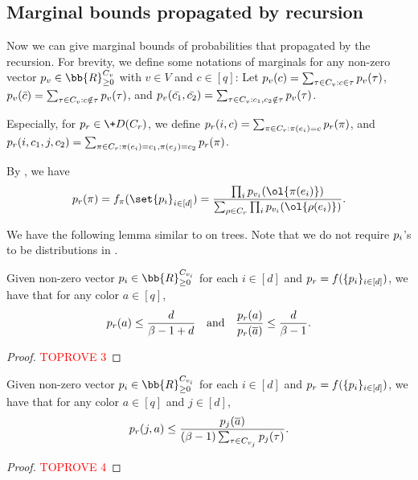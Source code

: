 \documentclass[a4paper,11pt]{article}
\begin{document}
\subsection{Marginal bounds propagated by recursion}\label{sec:marginal_bounds_on_trees}
Now we can give marginal bounds of probabilities that propagated by the recursion. For brevity, we define some notations of marginals for any non-zero vector $\*p_v\in \bb{R}_{\geq 0}^{C_v}$ with $v\in V$ and $c\in [q]$: Let $\*p_v(c)=\sum_{\tau \in C_v:c \in \tau} \*p_v(\tau)$, $\*p_v(\bar{c})=\sum_{\tau \in C_v:c \notin \tau} \*p_v(\tau)$, and $\*p_v(\bar{c_1},\bar{c_2})=\sum_{\tau \in C_v:c_1,c_2 \notin \tau} \*p_v(\tau)$.

Especially, for $\*p_r \in \+D(C_r)$, we define $\*p_r(i,c)=\sum_{\pi \in C_r: \pi(e_i)=c} \*p_r(\pi)$, and $\*p_r(i,c_1,j,c_2)=\sum_{\pi \in C_r: \pi(e_i)=c_1, \pi(e_j)=c_2} \*p_r(\pi)$.

By , we have
\begin{equation}\label{eq:tree-recursion-short}
    \*p_r(\pi)=f_\pi(\set{\*{p}_i}_{i\in [d]})=
    \frac{\prod_i \*p_{v_i}(\ol{\pi(e_i)})}
    {\sum_{\rho \in C_r} \prod_i \*p_{v_i}(\ol{\rho(e_i)})}.
\end{equation}

We have the following lemma similar to 
on trees. Note that we do not require $\*p_i$'s to be distributions in .
\begin{lemma}\label{lem:marginal_bound_1}
     Given non-zero vector $\*p_i\in \bb{R}_{\geq 0}^{C_{v_i}}$ for each $i\in [d]$ and $\*p_r = f(\{\*p_i\}_{i\in[d]})$, we have that for any color $a \in [q]$,
    \[
        \*p_r(a) \leq \frac{d}{\beta - 1 + d} \quad\mbox{and}\quad  \frac{\*p_r(a)}{\*p_r(\overline{a})} \leq \frac{d}{\beta - 1}.
    \]
    \end{lemma}
    \begin{proof}\textcolor{red}{TOPROVE 3}\end{proof}
    
\begin{lemma}\label{lem:marginal_bound_2}
    Given non-zero vector $\*p_i\in \bb{R}_{\geq 0}^{C_{v_i}}$ for each $i\in [d]$ and $\*p_r = f(\{\*p_i\}_{i\in[d]})$, we have that for any color $a\in [q]$ and $j\in [d]$,
    $$
        \*p_r(j,a) \leq \frac{\*p_j(\overline a)}{(\beta - 1)\sum_{\tau\in C_{v_j}}\*p_j(\tau)}.
    $$
\end{lemma}
\begin{proof}\textcolor{red}{TOPROVE 4}\end{proof}
 
\end{document}
